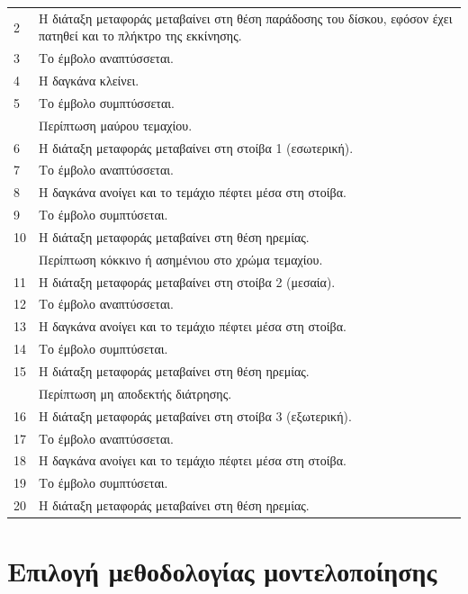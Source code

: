 \documentclass[a4paper,12pt,twoside]{report}
\begin{document}
\begin{longtable} { m{0.5cm} m{12cm} }
					2 & Η διάταξη μεταφοράς μεταβαίνει στη θέση παράδοσης του δίσκου, εφόσον έχει πατηθεί και το πλήκτρο της εκκίνησης.\\
					3 & Το έμβολο αναπτύσσεται.\\
					4 & Η δαγκάνα κλείνει.\\
					5 & Το έμβολο συμπτύσσεται.\\
					   & Περίπτωση μαύρου τεμαχίου.\\
					6 & Η διάταξη μεταφοράς μεταβαίνει στη στοίβα 1 (εσωτερική).\\
					7 & Το έμβολο αναπτύσσεται.\\
					8 & Η δαγκάνα ανοίγει και το τεμάχιο πέφτει μέσα στη στοίβα.\\
					9 & Το έμβολο συμπτύσεται.\\
					10 & Η διάταξη μεταφοράς μεταβαίνει στη θέση ηρεμίας.\\
					    & Περίπτωση κόκκινο ή ασημένιου στο χρώμα τεμαχίου.\\
					11 & Η διάταξη μεταφοράς μεταβαίνει στη στοίβα 2 (μεσαία).\\
					12 & Το έμβολο αναπτύσσεται.\\
					13 & Η δαγκάνα ανοίγει και το τεμάχιο πέφτει μέσα στη στοίβα.\\
					14 & Το έμβολο συμπτύσεται.\\
					15 & Η διάταξη μεταφοράς μεταβαίνει στη θέση ηρεμίας.\\
					    & Περίπτωση μη αποδεκτής διάτρησης.\\
					16 & Η διάταξη μεταφοράς μεταβαίνει στη στοίβα 3 (εξωτερική).\\
					17 & Το έμβολο αναπτύσσεται.\\
					18 & Η δαγκάνα ανοίγει και το τεμάχιο πέφτει μέσα στη στοίβα.\\
					19 & Το έμβολο συμπτύσεται.\\
					20 & Η διάταξη μεταφοράς μεταβαίνει στη θέση ηρεμίας.\\
					\hline
				\end{longtable}
				
				
				
		\section{Επιλογή μεθοδολογίας μοντελοποίησης}

\end{document}
